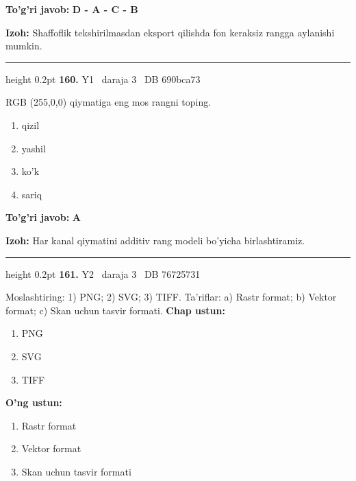 \documentclass[10pt,a4paper,oneside]{article}
\begin{document}
\begin{tcolorbox}[enhanced,breakable,colback=teal!4,colframe=teal!45!black,boxrule=0.45pt,arc=1.2mm,left=2.8mm,right=2.8mm,top=2mm,bottom=2mm,before skip=2mm,after skip=2mm]
\textbf{\color{teal}To'g'ri javob:} \textbf{D - A - C - B}
\par\smallskip
\textbf{Izoh:} Shaffoflik tekshirilmasdan eksport qilishda fon keraksiz rangga aylanishi mumkin.
\end{tcolorbox}
\vspace{2mm}\hrule height 0.2pt \vspace{4mm}
\hypertarget{q160}{\textbf{\color{ink}160.}}  {\color{muted}\scriptsize Y1 \textbullet\ daraja 3 \textbullet\ DB 690bca73}
\par
RGB (255,0,0) qiymatiga eng mos rangni toping.
\begin{enumerate}[label=\Alph*),leftmargin=9mm]
\item qizil
\item yashil
\item ko'k
\item sariq
\end{enumerate}
\begin{tcolorbox}[enhanced,breakable,colback=teal!4,colframe=teal!45!black,boxrule=0.45pt,arc=1.2mm,left=2.8mm,right=2.8mm,top=2mm,bottom=2mm,before skip=2mm,after skip=2mm]
\textbf{\color{teal}To'g'ri javob:} \textbf{A}
\par\smallskip
\textbf{Izoh:} Har kanal qiymatini additiv rang modeli bo'yicha birlashtiramiz.
\end{tcolorbox}
\vspace{2mm}\hrule height 0.2pt \vspace{4mm}
\hypertarget{q161}{\textbf{\color{ink}161.}}  {\color{muted}\scriptsize Y2 \textbullet\ daraja 3 \textbullet\ DB 76725731}
\par
Moslashtiring: 1) PNG; 2) SVG; 3) TIFF. Ta'riflar: a) Rastr format; b) Vektor format; c) Skan uchun tasvir formati.
\textbf{\footnotesize Chap ustun:}
\begin{enumerate}[label=\arabic*),leftmargin=9mm]
\item PNG
\item SVG
\item TIFF
\end{enumerate}
\textbf{\footnotesize O'ng ustun:}
\begin{enumerate}[label=\Alph*),leftmargin=9mm]
\item Rastr format
\item Vektor format
\item Skan uchun tasvir formati
\end{enumerate}
\end{document}
